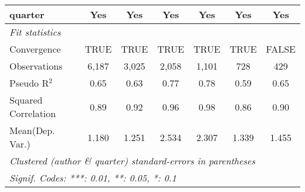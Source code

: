\begin{tabular}{lcccccc}
   quarter                                                    & Yes          & Yes           & Yes          & Yes         & Yes           & Yes\\  
   \midrule
   \emph{Fit statistics}\\
   Convergence                                                &TRUE          & TRUE          & TRUE         & TRUE        & TRUE          & FALSE\\  
   Observations                                               & 6,187        & 3,025         & 2,058        & 1,101       & 728           & 429\\  
   Pseudo R$^2$                                               & 0.65         & 0.63          & 0.77         & 0.78        & 0.59          & 0.65\\  
   Squared Correlation                                        & 0.89         & 0.92          & 0.96         & 0.98        & 0.86          & 0.90\\  
Mean(Dep. Var.) & 1.180 & 1.251 & 2.534 & 2.307 & 1.339 & 1.455 \\
   \midrule \midrule
   \multicolumn{7}{l}{\emph{Clustered (author \& quarter) standard-errors in parentheses}}\\
   \multicolumn{7}{l}{\emph{Signif. Codes: ***: 0.01, **: 0.05, *: 0.1}}\\
\end{tabular}
\par\endgroup
